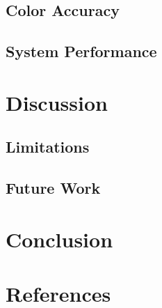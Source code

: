 \documentclass[12pt, letterpaper]{report}
\begin{document}
    \section{Color Accuracy}

    \section{System Performance}


    \chapter{Discussion}
    
    \section{Limitations}
    
    \section{Future Work}


    \chapter{Conclusion}

    
    \chapter*{References}



    \appendix
\end{document}
